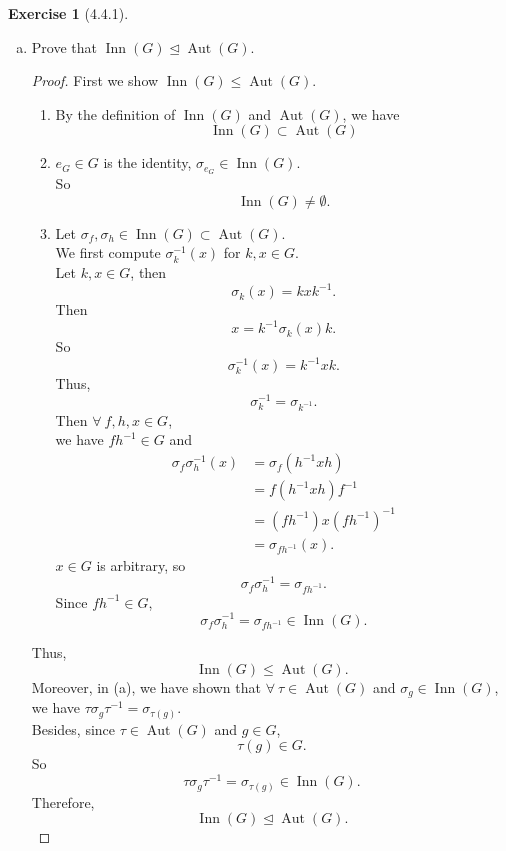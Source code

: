 \documentclass{amsart}
\theoremstyle{plain}
\theoremstyle{definition}
\newtheorem{exer}[lem]{Exercise}
\begin{document}
\begin{exer}[4.4.1]
\begin{enumerate}[(a)]
\item Prove that $\operatorname{Inn}(G)\unlhd\operatorname{Aut}(G)$.
  \begin{proof}
	First we show $\operatorname{Inn}(G) \leq \operatorname{Aut}(G)$.\\
	\begin{enumerate}
		\item
			By the definition of $\operatorname{Inn}(G)$ and $\operatorname{Aut}(G)$, we have
			\[\operatorname{Inn}(G) \subset \operatorname{Aut}(G)\]
		\item
		  $e_G \in G$ is the identity, $\sigma_{e_G} \in \operatorname{Inn}(G)$.\\
		 So 
		 \[\operatorname{Inn}(G) \neq \emptyset.\]
		\item
		  Let $\sigma_f,\sigma_h \in \operatorname{Inn}(G) \subset \operatorname{Aut}(G)$.\\
		We first compute $\sigma_k^{-1}(x)$ for $k,x\in G$.\\
		Let $k, x \in G$, then 
		\[\sigma_k(x) = kxk^{-1}.\]
		Then
		\[x = k^{-1}\sigma_k(x)k.\]
		So 
		\[\sigma_k^{-1}(x) = k^{-1}xk.\]
		Thus, 
		\[\sigma_k^{-1} = \sigma_{k^{-1}}.\]
		Then $\forall\ f,h,x \in G$, \\
		we have $fh^{-1} \in G$ and 
		\begin{align*}
		  \sigma_f\sigma_h^{-1}(x) &= \sigma_f(h^{-1}xh) \\
		  						   &= f(h^{-1}xh)f^{-1} \\
		  						   &= (fh^{-1})x(fh^{-1})^{-1} \\
		  						   &=\sigma_{fh^{-1}}(x).	
		\end{align*}
		$x\in G$ is arbitrary, so
		\[\sigma_f\sigma_h^{-1} = \sigma_{fh^{-1}}.\]
		Since $fh^{-1} \in G$,
		\[\sigma_f\sigma_h^{-1}  = \sigma_{fh^{-1}} \in \operatorname{Inn}(G).\]
	\end{enumerate}
	Thus, 
	\[\operatorname{Inn}(G) \leq \operatorname{Aut}(G). \]
  	Moreover, in (a), we have shown that $\forall\ \tau \in \operatorname{Aut}(G)$ and $\sigma_g \in \operatorname{Inn}(G)$,\\ 
  	we have $\tau\sigma_g\tau^{-1} = \sigma_{\tau(g)}$.\\
  	Besides, since $\tau \in \operatorname{Aut}(G)$ and $g\in G$, 
  	\[\tau(g) \in G.\]
  	So
  	\[\tau\sigma_g\tau^{-1} = \sigma_{\tau(g)} \in \operatorname{Inn}(G).\]
  	Therefore, 
  	\[\operatorname{Inn}(G) \unlhd \operatorname{Aut}(G). \]
  \end{proof}
\end{enumerate}
\end{exer}
\end{document}
